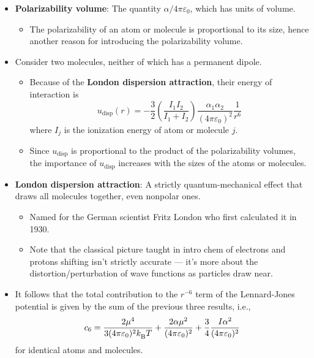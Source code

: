 \documentclass[../notes.tex]{subfiles}
\begin{document}
\begin{itemize}
\begin{itemize}
    \end{itemize}
    \item \textbf{Polarizability volume}: The quantity $\alpha/4\pi\varepsilon_0$, which has units of volume.
    \begin{itemize}
        \item The polarizability of an atom or molecule is proportional to its size, hence another reason for introducing the polarizability volume.
    \end{itemize}
    \item Consider two molecules, neither of which has a permanent dipole.
    \begin{itemize}
        \item Because of the \textbf{London dispersion attraction}, their energy of interaction is
        \begin{equation*}
            u_\text{disp}(r) = -\frac{3}{2}\left( \frac{I_1I_2}{I_1+I_2} \right)\frac{\alpha_1\alpha_2}{(4\pi\varepsilon_0)^2}\frac{1}{r^6}
        \end{equation*}
        where $I_j$ is the ionization energy of atom or molecule $j$.
        \item Since $u_\text{disp}$ is proportional to the product of the polarizability volumes, the importance of $u_\text{disp}$ increases with the sizes of the atoms or molecules.
    \end{itemize}
    \item \textbf{London dispersion attraction}: A strictly quantum-mechanical effect that draws all molecules together, even nonpolar ones.
    \begin{itemize}
        \item Named for the German scientist Fritz London who first calculated it in 1930.
        \item Note that the classical picture taught in intro chem of electrons and protons shifting isn't strictly accurate --- it's more about the distortion/perturbation of wave functions as particles draw near.
    \end{itemize}
    \item It follows that the total contribution to the $r^{-6}$ term of the Lennard-Jones potential is given by the sum of the previous three results, i.e.,
    \begin{equation*}
        c_6 = \frac{2\mu^4}{3(4\pi\varepsilon_0)^2{k_\text{B}^{}} T}+\frac{2\alpha\mu^2}{(4\pi\varepsilon_0)^2}+\frac{3}{4}\frac{I\alpha^2}{(4\pi\varepsilon_0)^2}
    \end{equation*}
    for identical atoms and molecules.
\end{itemize}
\end{document}
